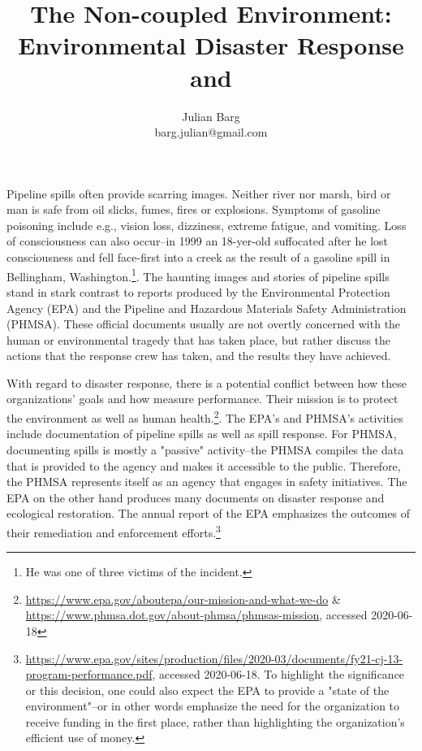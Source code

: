 \documentclass[12pt, man, natbib]{apa6}
\title{The Non-coupled Environment: Environmental Disaster Response and  }
\author{Julian Barg\\barg.julian@gmail.com}
\affiliation{Ivey Business School}
\begin{document}
	
	\maketitle
	
	\singlespacing
	
	\section{}

	Pipeline spills often provide scarring images. Neither river nor marsh, bird or man is safe from oil slicks, fumes, fires or explosions. Symptoms of gasoline poisoning include e.g., vision loss, dizziness, extreme fatigue, and vomiting. Loss of consciousness can also occur--in 1999 an 18-yer-old suffocated after he lost consciousness and fell face-first into a creek as the result of a gasoline spill in Bellingham, Washington.\footnote{He was one of three victims of the incident.}. The haunting images and stories of pipeline spills stand in stark contrast to reports produced by the Environmental Protection Agency (EPA) and the Pipeline and Hazardous Materials Safety Administration (PHMSA). These official documents usually are not overtly concerned with the human or environmental tragedy that has taken place, but rather discuss the actions that the response crew has taken, and the results they have achieved.
	
	With regard to disaster response, there is a potential conflict between how these organizations' goals and how measure performance. Their mission is to protect the environment as well as human health.\footnote{\url{https://www.epa.gov/aboutepa/our-mission-and-what-we-do} \& \url{https://www.phmsa.dot.gov/about-phmsa/phmsas-mission}, accessed 2020-06-18}. The EPA's and PHMSA's activities include documentation of pipeline spills as well as spill response. For PHMSA, documenting spills is mostly a "passive" activity--the PHMSA compiles the data that is provided to the agency and makes it accessible to the public. Therefore, the PHMSA represents itself as an agency that engages in safety initiatives. The EPA on the other hand produces many documents on disaster response and ecological restoration. The annual report of the EPA emphasizes the outcomes of their remediation and enforcement efforts.\footnote{\url{https://www.epa.gov/sites/production/files/2020-03/documents/fy21-cj-13-program-performance.pdf}, accessed 2020-06-18. To highlight the significance or this decision, one could also expect the EPA to provide a "state of the environment"--or in other words emphasize the need for the organization to receive funding in the first place, rather than highlighting the organization's efficient use of money.}
	
\end{document}
